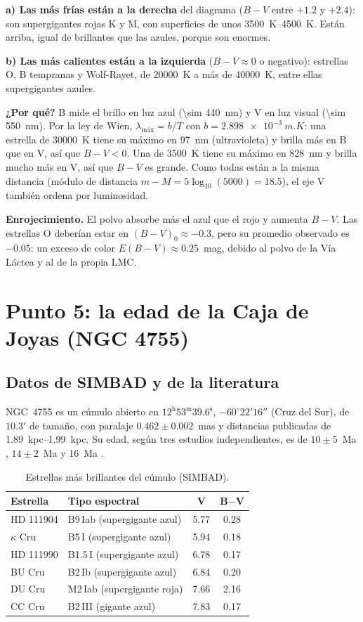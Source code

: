 \documentclass[11pt,a4paper]{article}
\begin{document}
\textbf{a) Las más frías están a la derecha} del diagrama ($B-V$ entre $+1.2$ y $+2.4$): son
supergigantes rojas K y M, con superficies de unos \SIrange{3500}{4500}{K}. Están arriba, igual de
brillantes que las azules, porque son enormes.

\textbf{b) Las más calientes están a la izquierda} ($B-V \approx 0$ o negativo): estrellas O, B
tempranas y Wolf-Rayet, de \SI{20000}{K} a más de \SI{40000}{K}, entre ellas supergigantes azules.

\textbf{¿Por qué?} B mide el brillo en luz azul (\SI{\sim 440}{nm}) y V en luz visual
(\SI{\sim 550}{nm}). Por la ley de Wien, $\lambda_\text{máx} = b/T$ con
$b = \SI{2.898e-3}{m.K}$: una estrella de \SI{30000}{K} tiene su máximo en \SI{97}{nm}
(ultravioleta) y brilla más en B que en V, así que $B-V<0$. Una de \SI{3500}{K} tiene su máximo en
\SI{828}{nm} y brilla mucho más en V, así que $B-V$ es grande. Como todas están a la misma distancia
(módulo de distancia $m - M = 5\log_{10}(5000) = 18.5$), el eje V también ordena por luminosidad.

\textbf{Enrojecimiento.} El polvo absorbe más el azul que el rojo y aumenta $B-V$. Las estrellas O
deberían estar en $(B-V)_0 \approx -0.3$, pero su promedio observado es $-0.05$: un exceso de color
$E(B-V) \approx 0.25$~mag, debido al polvo de la Vía Láctea y al de la propia LMC.

\section{Punto 5: la edad de la Caja de Joyas (NGC 4755)}

\subsection{Datos de SIMBAD y de la literatura}
NGC~4755 es un cúmulo abierto en $12^\text{h}53^\text{m}39.6^\text{s}$, $-60^\circ22'16''$ (Cruz del
Sur), de $10.3'$ de tamaño, con paralaje $0.462 \pm 0.002$~mas y distancias publicadas de
\SIrange{1.89}{1.99}{kpc}. Su edad, según tres estudios independientes, es de
$10 \pm 5$~Ma \cite{sanner}, $14 \pm 2$~Ma \cite{bonatto} y 16~Ma \cite{piskunov}.

\begin{table}[H]
\centering
\caption{Estrellas más brillantes del cúmulo (SIMBAD).}
\begin{tabular}{llcc}
\toprule
Estrella & Tipo espectral & V & B$-$V \\
\midrule
HD 111904 & B9\,Iab (supergigante azul) & 5.77 & 0.28 \\
$\kappa$ Cru & B5\,I (supergigante azul) & 5.94 & 0.18 \\
HD 111990 & B1.5\,I (supergigante azul) & 6.78 & 0.17 \\
BU Cru & B2\,Ib (supergigante azul) & 6.84 & 0.20 \\
DU Cru & M2\,Iab (supergigante roja) & 7.66 & 2.16 \\
CC Cru & B2\,III (gigante azul) & 7.83 & 0.17 \\
\bottomrule
\end{tabular}
\end{table}
\end{document}
